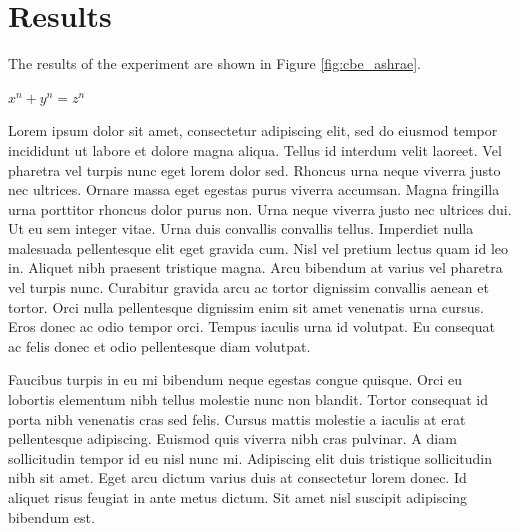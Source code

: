 

\section{Results}

The results of the experiment are shown in Figure \ref{fig:cbe_ashrae}.

$ x^n + y^n = z^n $

Lorem ipsum dolor sit amet, consectetur adipiscing elit, sed do eiusmod tempor incididunt ut labore et dolore magna aliqua. Tellus id interdum velit laoreet. Vel pharetra vel turpis nunc eget lorem dolor sed. Rhoncus urna neque viverra justo nec ultrices. Ornare massa eget egestas purus viverra accumsan. Magna fringilla urna porttitor rhoncus dolor purus non. Urna neque viverra justo nec ultrices dui. Ut eu sem integer vitae. Urna duis convallis convallis tellus. Imperdiet nulla malesuada pellentesque elit eget gravida cum. Nisl vel pretium lectus quam id leo in. Aliquet nibh praesent tristique magna. Arcu bibendum at varius vel pharetra vel turpis nunc. Curabitur gravida arcu ac tortor dignissim convallis aenean et tortor. Orci nulla pellentesque dignissim enim sit amet venenatis urna cursus. Eros donec ac odio tempor orci. Tempus iaculis urna id volutpat. Eu consequat ac felis donec et odio pellentesque diam volutpat.

Faucibus turpis in eu mi bibendum neque egestas congue quisque. Orci eu lobortis elementum nibh tellus molestie nunc non blandit. Tortor consequat id porta nibh venenatis cras sed felis. Cursus mattis molestie a iaculis at erat pellentesque adipiscing. Euismod quis viverra nibh cras pulvinar. A diam sollicitudin tempor id eu nisl nunc mi. Adipiscing elit duis tristique sollicitudin nibh sit amet. Eget arcu dictum varius duis at consectetur lorem donec. Id aliquet risus feugiat in ante metus dictum. Sit amet nisl suscipit adipiscing bibendum est.

